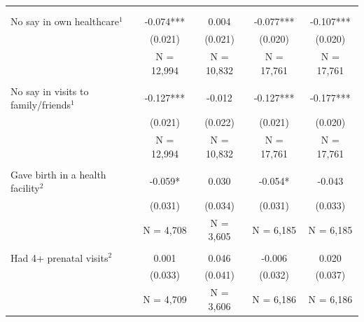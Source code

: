\begin{tabular}{lcccc}
\toprule
 &  &  &  &  \\\\
\midrule
No say in own healthcare$^1$&-0.074***&0.004&-0.077***&-0.107***\\
&(0.021)&(0.021)&(0.020)&(0.020)\\
&N = 12,994&N = 10,832&N = 17,761&N = 17,761\\
&&&&\\
No say in visits to family/friends$^1$&-0.127***&-0.012&-0.127***&-0.177***\\
&(0.021)&(0.022)&(0.021)&(0.020)\\
&N = 12,994&N = 10,832&N = 17,761&N = 17,761\\
&&&&\\
Gave birth in a health facility$^2$&-0.059*&0.030&-0.054*&-0.043\\
&(0.031)&(0.034)&(0.031)&(0.033)\\
&N = 4,708&N = 3,605&N = 6,185&N = 6,185\\
&&&&\\
Had 4+ prenatal visits$^2$&0.001&0.046&-0.006&0.020\\
&(0.033)&(0.041)&(0.032)&(0.037)\\
&N = 4,709&N = 3,606&N = 6,186&N = 6,186\\
\bottomrule
\end{tabular}
